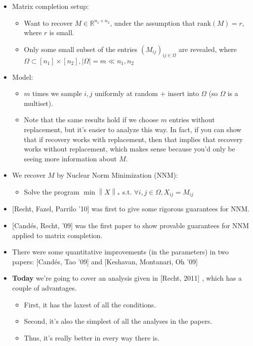 \documentclass[11pt]{article}
\newcommand{\norm}[1]{\left\| #1 \right\|}
\begin{document}
\begin{itemize}
\item Matrix completion setup:
 \begin{itemize}
  \item Want to recover $M \in \mathbb{R}^{n_1 \times n_2}$, under the assumption that $\text{rank}(M) = r$, where $r$ is small.
  \item Only some small subset of the entries $(M_{ij})_{ij \in \Omega}$ are revealed, where $\Omega \subset [n_1] \times [n_2], |\Omega| = m \ll n_1, n_2$
  \end{itemize}
  \item Model:
  \begin{itemize}
  \item $m$ times we sample $i, j$ uniformly at random + insert into $\Omega$ (so $\Omega$ is a multiset). 
  \item Note that the same results hold if we choose $m$ entries without replacement, but it's easier to analyze this way. In fact, if you can show that if recovery works with replacement, then that implies that recovery works without replacement, which makes sense because you'd only be seeing more information about $M$.
  \end{itemize}
  \item We recover $M$ by Nuclear Norm Minimization (NNM): 
  \begin{itemize}
  \item Solve the program $ \min \norm{X}_{*}$ s.t. $\forall i,j\in \Omega, X_{ij} = M_{ij} $
  \end{itemize}

 \item {[}Recht, Fazel, Parrilo '10] \cite{recht2010guaranteed} was first to give some rigorous guarantees for NNM. 
 \item {[}Cand{\'e}s, Recht, '09] \cite{candes2009exact} was the first paper to show provable guarantees for NNM applied to matrix completion.
 \item There were some quantitative improvements (in the parameters) in two papers: [Cand{\'e}s, Tao '09] \cite{candes2010power} and [Keshavan, Montanari, Oh '09] \cite{keshavan2010matrix}
 \item \textbf{Today} we're going to cover an analysis given in [Recht, 2011] \cite{recht2011simpler}, which has a couple of advantages.
 \begin{itemize}
 \item First, it has the laxest of all the conditions.
 \item Second, it's also the simplest of all the analyses in the papers.
 \item Thus, it's really better in every way there is.
 \end{itemize}
\end{itemize}
\end{document}
